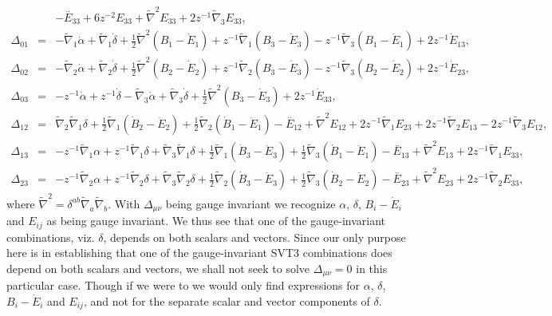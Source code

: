 \documentclass[aps,onecolumn,10pt]{revtex4}
\numberwithin{equation}{section}
\numberwithin{equation}{section}
\begin{document}
\begin{eqnarray}
\nonumber \\ 
&&  -\overset{..}{E}_{33}+ 6 z^{-2} E_{33} + \tilde\nabla^{2}{}E_{33} + 2 z^{-1} \tilde{\nabla}_{3}E_{33},
 \nonumber\\ 
\Delta_{01}&=& - \tilde{\nabla}_{1}\dot{\alpha} + \tilde{\nabla}_{1}\dot{\delta}+\tfrac{1}{2} \tilde\nabla^{2}{}(B_1-\dot{E}_1) + z^{-1} \tilde{\nabla}_{1}(B_3-\dot{E}_3) -  z^{-1} \tilde{\nabla}_{3}(B_1-\dot{E}_1)+2 z^{-1} \dot{E}_{13},
 \nonumber\\ 
\Delta_{02}&=& - \tilde{\nabla}_{2}\dot{\alpha} + \tilde{\nabla}_{2}\dot{\delta}+\tfrac{1}{2} \tilde\nabla^{2}{}(B_2-\dot{E}_2) + z^{-1} \tilde{\nabla}_{2}(B_3-\dot{E}_3) -  z^{-1} \tilde{\nabla}_{3}(B_2-\dot{E}_2)+2 z^{-1} \dot{E}_{23},
 \nonumber\\ 
\Delta_{03}&=& - z^{-1} \dot{\alpha} + z^{-1} \dot{\delta} -  \tilde{\nabla}_{3}\dot{\alpha} + \tilde{\nabla}_{3}\dot{\delta}+\tfrac{1}{2} \tilde\nabla^{2}{}(B_3-\dot{E}_3)+2 z^{-1} \dot{E}_{33},
 \nonumber\\ 
\Delta_{12}&=& \tilde{\nabla}_{2}\tilde{\nabla}_{1}\delta +\tfrac{1}{2} \tilde{\nabla}_{1}(\dot{B}_2-\ddot{E}_2) + \tfrac{1}{2} \tilde{\nabla}_{2}(\dot{B}_1-\ddot{E}_1)- \overset{..}{E}_{12} + \tilde\nabla^{2}{}E_{12} + 2 z^{-1} \tilde{\nabla}_{1}E_{23} + 2 z^{-1} \tilde{\nabla}_{2}E_{13} - 2 z^{-1} \tilde{\nabla}_{3}E_{12},
 \nonumber\\ 
\Delta_{13}&=& - z^{-1} \tilde{\nabla}_{1}\alpha + z^{-1} \tilde{\nabla}_{1}\delta + \tilde{\nabla}_{3}\tilde{\nabla}_{1}\delta +\tfrac{1}{2} \tilde{\nabla}_{1}(\dot{B}_3-\ddot{E}_3) + \tfrac{1}{2} \tilde{\nabla}_{3}(\dot{B}_1-\ddot{E}_1)- \overset{..}{E}_{13} + \tilde\nabla^{2}{}E_{13} + 2 z^{-1} \tilde{\nabla}_{1}E_{33},
 \nonumber\\ 
\Delta_{23}&=& - z^{-1} \tilde{\nabla}_{2}\alpha + z^{-1} \tilde{\nabla}_{2}\delta + \tilde{\nabla}_{3}\tilde{\nabla}_{2}\delta +\tfrac{1}{2} \tilde{\nabla}_{2}(\dot{B}_3-\ddot{E}_3) + \tfrac{1}{2} \tilde{\nabla}_{3}(\dot{B}_2-\ddot{E}_2)- \overset{..}{E}_{23} + \tilde\nabla^{2}{}E_{23} + 2 z^{-1} \tilde{\nabla}_{2}E_{33},
\label{14.4} 
\end{eqnarray}
%
where $\tilde\nabla^{2} = \delta^{ab} \tilde\nabla_a\tilde\nabla_b$. With $\Delta_{\mu\nu}$ being gauge invariant we recognize $\alpha$, $\delta$, $B_i-\dot{E}_i$ and $E_{ij}$ as being gauge invariant. We thus see that one of the gauge-invariant combinations, viz. $\delta$, depends on both scalars and vectors. Since our only purpose here is in establishing that one of the gauge-invariant SVT3 combinations does depend on both scalars and vectors, we shall not seek to solve $\Delta_{\mu\nu}=0$ in this particular case. Though if we were to we would only find expressions for $\alpha$, $\delta$, $B_i-\dot{E}_i$ and $E_{ij}$, and not for the separate scalar and vector components of $\delta$.
\end{document}
